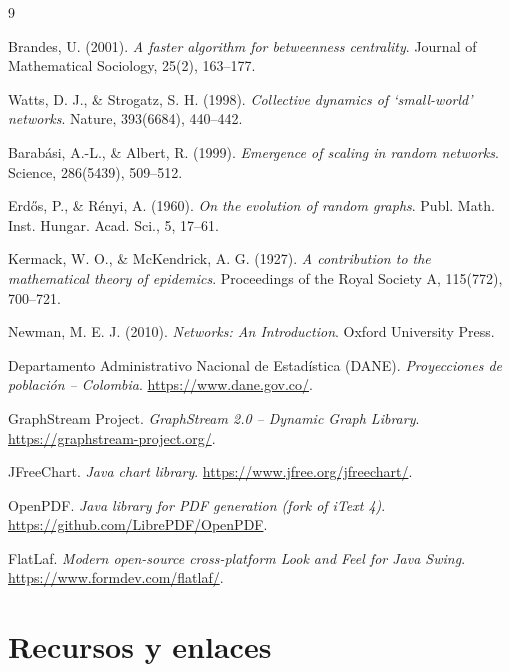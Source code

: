 \documentclass[spanish,notitlepage,letterpaper, 12pt]{article}
\begin{document}
\begin{thebibliography}{9}

Brandes, U. (2001).
\emph{A faster algorithm for betweenness centrality}.
Journal of Mathematical Sociology, 25(2), 163--177.

Watts, D. J., \& Strogatz, S. H. (1998).
\emph{Collective dynamics of `small-world' networks}.
Nature, 393(6684), 440--442.

Barab\'asi, A.-L., \& Albert, R. (1999).
\emph{Emergence of scaling in random networks}.
Science, 286(5439), 509--512.

Erd\H{o}s, P., \& R\'enyi, A. (1960).
\emph{On the evolution of random graphs}.
Publ. Math. Inst. Hungar. Acad. Sci., 5, 17--61.

Kermack, W. O., \& McKendrick, A. G. (1927).
\emph{A contribution to the mathematical theory of epidemics}.
Proceedings of the Royal Society A, 115(772), 700--721.

Newman, M. E. J. (2010).
\emph{Networks: An Introduction}.
Oxford University Press.

Departamento Administrativo Nacional de Estad\'istica (DANE).
\emph{Proyecciones de poblaci\'on -- Colombia}. \url{https://www.dane.gov.co/}.

GraphStream Project.
\emph{GraphStream 2.0 -- Dynamic Graph Library}.
\url{https://graphstream-project.org/}.

JFreeChart.
\emph{Java chart library}.
\url{https://www.jfree.org/jfreechart/}.

OpenPDF.
\emph{Java library for PDF generation (fork of iText 4)}.
\url{https://github.com/LibrePDF/OpenPDF}.

FlatLaf.
\emph{Modern open-source cross-platform Look and Feel for Java Swing}.
\url{https://www.formdev.com/flatlaf/}.

\end{thebibliography}

\newpage
\appendix

\section{Recursos y enlaces}
\label{anexo:enlaces}
\end{document}
